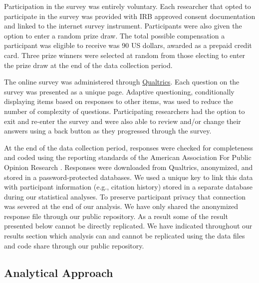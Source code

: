 \documentclass[]{interact}
\theoremstyle{plain}%
\theoremstyle{definition}
\theoremstyle{remark}
\begin{document}
Participation in the survey was entirely voluntary. 
Each researcher that opted to participate in the survey was provided with IRB approved consent documentation and linked to the internet survey instrument. 
Participants were also given the option to enter a random prize draw. 
The total possible compensation a participant was eligible to receive was 90 US dollars, awarded as a prepaid credit card.
Three prize winners were selected at random from those electing to enter the prize draw at the end of the data collection period.

The online survey was administered through \href{https://www.qualtrics.com/}{Qualtrics}. 
Each question on the survey was presented as a unique page. 
Adaptive questioning, conditionally displaying items based on responses to other items, was used to reduce the number of complexity of questions.
Participating researchers had the option to exit and re-enter the survey and were also able to review and/or change their answers using a back button as they progressed through the survey.

At the end of the data collection period, responses were checked for completeness and coded using the reporting standards of the American Association For Public Opinion Research \citep{aaporstandards}.
Responses were downloaded from Qualtrics, anonymized, and stored in a password-protected databases.
We used a unique key to link this data with participant information (e.g., citation history) stored in a separate database during our statistical analyses. 
To preserve participant privacy that connection was severed at the end of our analysis.
We have only shared the anonymized response file through our public repository. 
As a result some of the result presented below cannot be directly replicated. 
We have indicated throughout our results section which analysis can and cannot be replicated using the data files and code share through our public repository. 

\subsection*{Analytical Approach}

\end{document}

